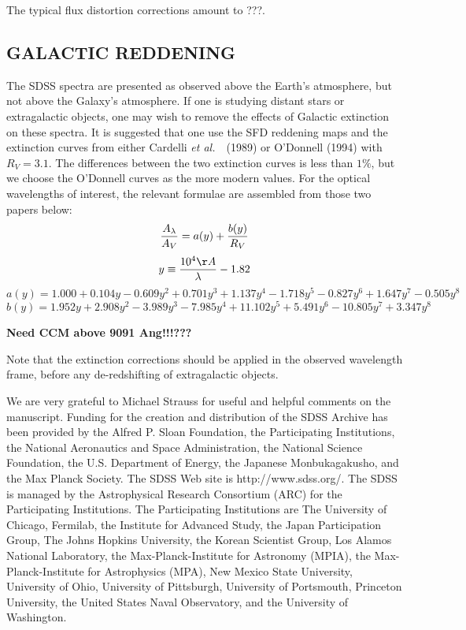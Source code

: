 \documentclass[12pt,preprint]{aastex}
\newcommand{\etal}{{\it et al.}~}
\begin{document}
The typical flux distortion corrections amount to ???.

\subsection{GALACTIC REDDENING}

The SDSS spectra are presented as observed above the Earth's
atmosphere, but not above the Galaxy's atmosphere.
If one is studying distant stars or extragalactic objects,
one may wish to remove the effects of Galactic extinction
on these spectra.  It is suggested that one use the SFD reddening
maps and the extinction curves from either Cardelli \etal\ (1989)
or O'Donnell (1994) with $R_V=3.1$.  The differences between the
two extinction curves is less than $1\%$, but we choose the O'Donnell
curves as the more modern values.  For the optical wavelengths
of interest, the relevant formulae are
assembled from those two papers below:
$$ {A_\lambda \over A_V} = a(y) + {b(y)\over R_V} $$
$$ y \equiv {10^4\AA \over \lambda} - 1.82 $$
$$ a(y) = 1.000 + 0.104 y - 0.609 y^2 + 0.701 y^3 + 1.137 y^4
  - 1.718 y^5 - 0.827 y^6 + 1.647 y^7 - 0.505 y^8 $$
$$ b(y) = 1.952 y + 2.908 y^2 - 3.989 y^3 - 7.985 y^4
  + 11.102 y^5 + 5.491 y^6 - 10.805 y^7 + 3.347 y^8 $$

{\bf Need CCM above 9091 Ang!!!???}

Note that the extinction corrections should be applied in the
observed wavelength frame, before any de-redshifting of extragalactic objects.



\bigskip
We are very grateful to Michael Strauss for
useful and helpful comments on the manuscript.
Funding for the creation and distribution of the SDSS Archive has been
provided by the Alfred P. Sloan Foundation, the Participating
Institutions, the National Aeronautics and Space Administration, the
National Science Foundation, the U.S. Department of Energy, the
Japanese Monbukagakusho, and the Max Planck Society. The SDSS Web site
is http://www.sdss.org/. The SDSS is managed by the Astrophysical
Research Consortium (ARC) for the Participating Institutions. The
Participating Institutions are The University of Chicago, Fermilab,
the Institute for Advanced Study, the Japan Participation Group,
The Johns Hopkins University, the Korean Scientist Group, Los Alamos
National Laboratory, the Max-Planck-Institute for Astronomy (MPIA),
the Max-Planck-Institute for Astrophysics (MPA), New Mexico State
University, University of Ohio, University of Pittsburgh,
University of Portsmouth,
Princeton University, the United States Naval Observatory, and
the University of Washington.
\end{document}
